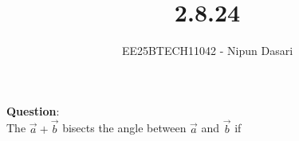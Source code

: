 \documentclass[journal]{IEEEtran}
\begin{document}
	
	
	\vspace{3cm}
	
	\title{2.8.24}
	\author{EE25BTECH11042 - Nipun Dasari}
	\maketitle
	{\let\newpage\relax\maketitle}
	
	\renewcommand{\thefigure}{\theenumi}
	\renewcommand{\thetable}{\theenumi}
	\setlength{\intextsep}{10pt} %
	
	
	\renewcommand{\thetable}{\theenumi}
	
	\textbf{Question}:\\
	The $\vec{a} + \vec{b}$ bisects the angle between $\vec{a}$ and $\vec{b}$ if \underline{\hspace{2cm}}
	
\end{document}
